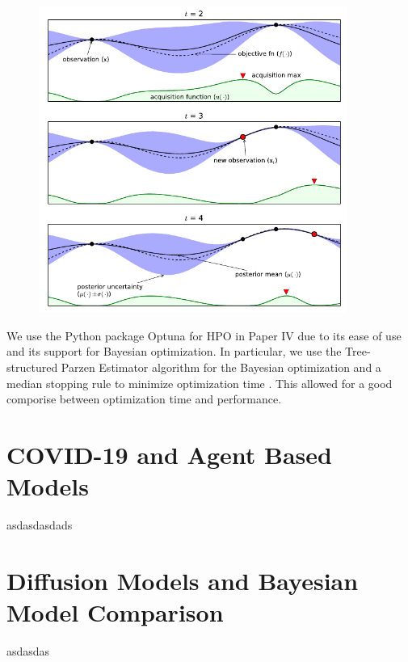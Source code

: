 \begin{figure}[htbp]
    \centering
    \includegraphics[width=0.9\textwidth]{figures/MasterThesis-hpo-bayesian}
\end{figure}

We use the Python package Optuna \autocite{akibaOptunaNextgenerationHyperparameter2019} for HPO in Paper IV due to its ease of use and its support for Bayesian optimization. In particular, we use the Tree-structured Parzen Estimator algorithm for the Bayesian optimization and a median stopping rule to minimize optimization time \parencite{bergstraAlgorithmsHyperParameterOptimization2011}. This allowed for a good comporise between optimization time and performance.


\section{COVID-19 and Agent Based Models}
\label{section:agent-based-models}
asdasdasdads

\section{Diffusion Models and Bayesian Model Comparison}
\label{section:diffusion}
asdasdas
